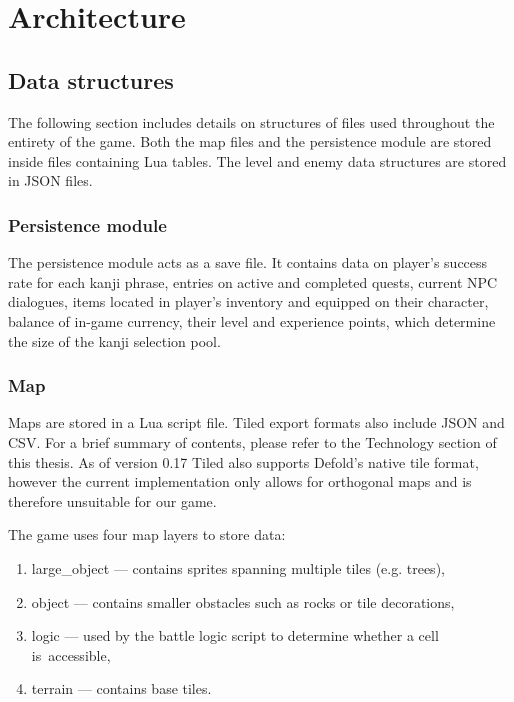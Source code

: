 \documentclass[thesis=B,english,hidelinks]{FITthesisXE}[2012/06/26]
\begin{document}
\newpage

\section{Architecture}

\subsection{Data structures}

The following section includes details on structures of files used throughout the entirety of the game. Both the map files and the persistence module are stored inside files containing Lua tables. The level and enemy data structures are stored in JSON files.

\subsubsection{Persistence module}

The persistence module acts as a save file. It contains data on player's success rate for each kanji phrase, entries on active and completed quests, current NPC dialogues, items located in player's inventory and equipped on their character, balance of in-game currency, their level and experience points, which determine the size of the kanji selection pool.

\subsubsection{Map}

Maps are stored in a Lua script file. Tiled export formats also include JSON and CSV. For a brief summary of contents, please refer to the Technology section of this thesis. As of version 0.17 Tiled also supports Defold's native tile format, however the current implementation only allows for orthogonal maps and is therefore unsuitable for our game.

The game uses four map layers to store data:

\begin{enumerate}
\item large\_object --- contains sprites spanning multiple tiles (e.g. trees),
\item object --- contains smaller obstacles such as rocks or tile decorations,
\item logic --- used by the battle logic script to determine whether a cell is~accessible,
\item terrain --- contains base tiles.
\end{enumerate}
\end{document}
